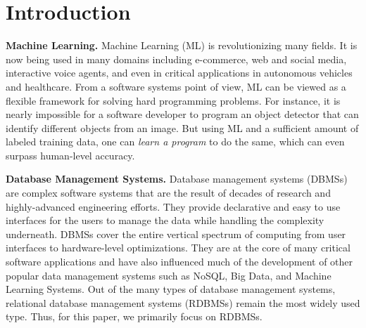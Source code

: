 \section{Introduction}

\vspace{2mm}
\noindent \textbf{Machine Learning.} Machine Learning (ML) is revolutionizing many fields.
It is now being used in many domains including e-commerce, web and social media, interactive voice agents, and even in critical applications in autonomous vehicles and healthcare.
From a software systems point of view, ML can be viewed as a flexible framework for solving hard programming problems.
For instance, it is nearly impossible for a software developer to program an object detector that can identify different objects from an image.
But using ML and a sufficient amount of labeled training data, one can \textit{learn a program} to do the same, which can even surpass human-level accuracy.

\vspace{2mm}
\noindent \textbf{Database Management Systems.} Database management systems (DBMSs) are complex software systems that are the result of decades of research and highly-advanced engineering efforts.
They provide declarative and easy to use interfaces for the users to manage the data while handling the complexity underneath.
DBMSs cover the entire vertical spectrum of computing from user interfaces to hardware-level optimizations.
They are at the core of many critical software applications and have also influenced much of the development of other popular data management systems such as NoSQL, Big Data, and Machine Learning Systems.
Out of the many types of database management systems, relational database management systems (RDBMSs) remain the most widely used type.
Thus, for this paper, we primarily focus on RDBMSs.

